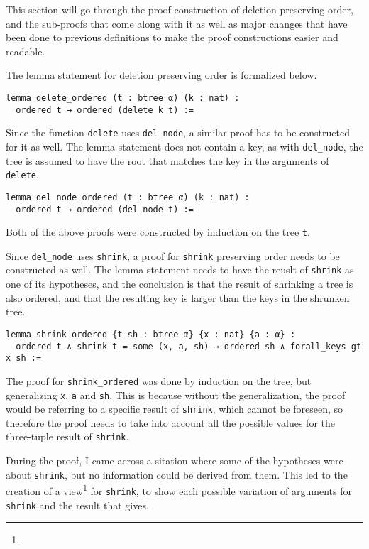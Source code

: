 This section will go through the proof construction of deletion preserving order, and the sub-proofs that come along with it as well as major changes that have been done to previous definitions to make the proof constructions easier and readable.

The lemma statement for deletion preserving order is formalized below.

\begin{lstlisting}[caption=\empty]
lemma delete_ordered (t : btree α) (k : nat) :
  ordered t → ordered (delete k t) :=
\end{lstlisting}

Since the function \lstinline{delete} uses \lstinline{del_node}, a similar proof has to be constructed for it as well. The lemma statement does not contain a key, as with \lstinline{del_node}, the tree is assumed to have the root that matches the key in the arguments of \lstinline{delete}.

\begin{lstlisting}[caption=\empty]
lemma del_node_ordered (t : btree α) (k : nat) :
  ordered t → ordered (del_node t) :=
\end{lstlisting}

Both of the above proofs were constructed by induction on the tree \lstinline{t}.

Since \lstinline{del_node} uses \lstinline{shrink}, a proof for \lstinline{shrink} preserving order needs to be constructed as well. The lemma statement needs to have the reuslt of \lstinline{shrink} as one of its hypotheses, and the conclusion is that the result of shrinking a tree is also ordered, and that the resulting key is larger than the keys in the shrunken tree.

\begin{lstlisting}[caption=\empty, label={lst:shrink_ordered}]
lemma shrink_ordered {t sh : btree α} {x : nat} {a : α} :
  ordered t ∧ shrink t = some (x, a, sh) → ordered sh ∧ forall_keys gt x sh :=
\end{lstlisting}

The proof for \lstinline{shrink_ordered} was done by induction on the tree, but generalizing \lstinline{x}, \lstinline{a} and \lstinline{sh}. This is because without the generalization, the proof would be referring to a specific result of \lstinline{shrink}, which cannot be foreseen, so therefore the proof needs to take into account all the possible values for the three-tuple result of \lstinline{shrink}.

During the proof, I came across a sitation where some of the hypotheses were about \lstinline{shrink}, but no information could be derived from them. This led to the creation of a view\footnote{} for \lstinline{shrink}, to show each possible variation of arguments for \lstinline{shrink} and the result that gives.

